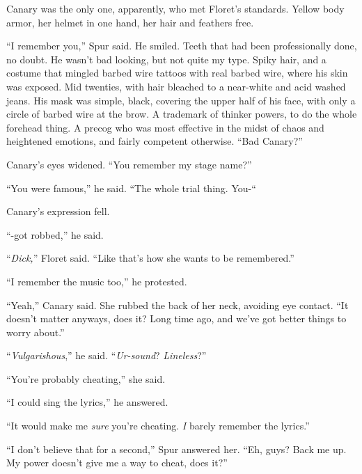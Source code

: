 Canary was the only one, apparently, who met Floret's standards.  Yellow body armor, her helmet in one hand, her hair and feathers free.



``I remember you,'' Spur said.  He smiled.  Teeth that had been professionally done, no doubt.  He wasn't bad looking, but not quite my type.  Spiky hair, and a costume that mingled barbed wire tattoos with real barbed wire, where his skin was exposed.  Mid twenties, with hair bleached to a near-white and acid washed jeans.  His mask was simple, black, covering the upper half of his face, with only a circle of barbed wire at the brow.  A trademark of thinker powers, to do the whole forehead thing.  A precog who was most effective in the midst of chaos and heightened emotions, and fairly competent otherwise.  ``Bad Canary?''



Canary's eyes widened.  ``You remember my stage name?''



``You were famous,'' he said.  ``The whole trial thing.  You-``



Canary's expression fell.



``-got robbed,'' he said.



``\emph{Dick,}'' Floret said.  ``Like that's how she wants to be remembered.''



``I remember the music too,'' he protested.



``Yeah,'' Canary said.  She rubbed the back of her neck, avoiding eye contact.  ``It doesn't matter anyways, does it?  Long time ago, and we've got better things to worry about.''



``\emph{Vulgarishous},'' he said.  ``\emph{Ur-sound}?  \emph{Lineless}?''



``You're probably cheating,'' she said.



``I could sing the lyrics,'' he answered.



``It would make me \emph{sure} you're cheating.  \emph{I} barely remember the lyrics.''



``I don't believe that for a second,'' Spur answered her.  ``Eh, guys?  Back me up.  My power doesn't give me a way to cheat, does it?''



